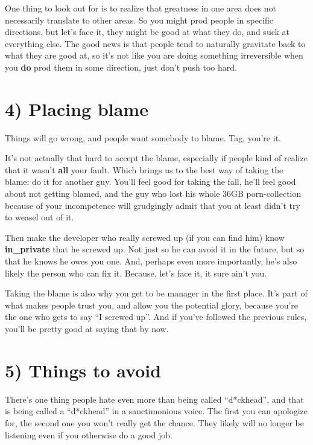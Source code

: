 \documentclass[a4paper,8pt,english]{sphinxmanual}
\begin{document}
One thing to look out for is to realize that greatness in one area does
not necessarily translate to other areas.  So you might prod people in
specific directions, but let's face it, they might be good at what they
do, and suck at everything else.  The good news is that people tend to
naturally gravitate back to what they are good at, so it's not like you
are doing something irreversible when you \textbf{do} prod them in some
direction, just don't push too hard.


\section{4) Placing blame}
\label{process/management-style:placing-blame}
Things will go wrong, and people want somebody to blame. Tag, you're it.

It's not actually that hard to accept the blame, especially if people
kind of realize that it wasn't \textbf{all} your fault.  Which brings us to the
best way of taking the blame: do it for another guy. You'll feel good
for taking the fall, he'll feel good about not getting blamed, and the
guy who lost his whole 36GB porn-collection because of your incompetence
will grudgingly admit that you at least didn't try to weasel out of it.

Then make the developer who really screwed up (if you can find him) know
\textbf{in\_private} that he screwed up.  Not just so he can avoid it in the
future, but so that he knows he owes you one.  And, perhaps even more
importantly, he's also likely the person who can fix it.  Because, let's
face it, it sure ain't you.

Taking the blame is also why you get to be manager in the first place.
It's part of what makes people trust you, and allow you the potential
glory, because you're the one who gets to say ``I screwed up''.  And if
you've followed the previous rules, you'll be pretty good at saying that
by now.


\section{5) Things to avoid}
\label{process/management-style:things-to-avoid}
There's one thing people hate even more than being called ``d*ckhead'',
and that is being called a ``d*ckhead'' in a sanctimonious voice.  The
first you can apologize for, the second one you won't really get the
chance.  They likely will no longer be listening even if you otherwise
do a good job.
\end{document}

